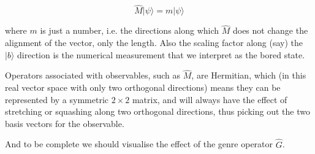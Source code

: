 $$
\hat{M}|\psi\rangle = m|\psi\rangle
$$

where $m$ is just a number, i.e. the directions along which $\hat{M}$ does not change the alignment of the vector, only the length. Also the scaling factor along (say) the $|b\rangle$ direction is the numerical measurement that we interpret as the bored state.

Operators associated with observables, such as $\hat{M}$, are Hermitian, which (in this real vector space with only two orthogonal directions) means they can be represented by a symmetric $2 \times 2$ matrix, and will always have the effect of stretching or squashing along two orthogonal directions, thus picking out the two basis vectors for the observable.

And to be complete we should visualise the effect of the genre operator $\hat{G}$.

